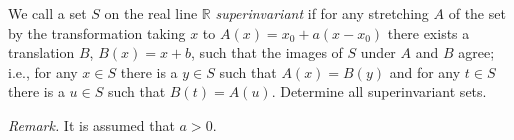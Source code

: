 We call a set $S$ on the real line $\mathbb{R}$ \emph{superinvariant} if for any stretching $A$ of the set by the transformation taking $x$ to $A(x) = x_0 + a(x - x_0)$ there exists a translation $B$, $B(x) = x + b$, such that the images of $S$ under $A$ and $B$ agree; i.e., for any $x \in S$ there is a $y \in S$ such that $A(x) = B(y)$ and for any $t \in S$ there is a $u \in S$ such that $B(t) = A(u)$. Determine all superinvariant sets.

\emph{Remark.} It is assumed that $a > 0$.

